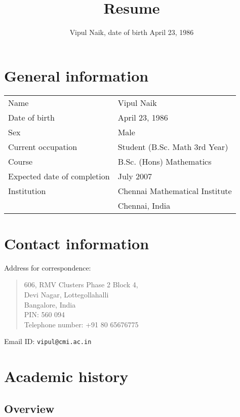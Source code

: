 \documentclass[12pt,a4paper,oneside]{amsart}
\title{Resume}
\author{\small{Vipul Naik, date of birth April 23, 1986}}
\begin{document}
\maketitle
\fancyhead{}
\fancyfoot{}

\cfoot{\thepage}
\section{General information}
\vspace{0.25in}

\begin{tabular}{|l|l|}
  \hline
  Name & Vipul Naik\\
  Date of birth & April 23, 1986\\
  Sex & Male\\
  Current occupation & Student (B.Sc. Math 3rd Year) \\
  Course & B.Sc. (Hons) Mathematics\\
  Expected date of completion & July 2007 \\
  Institution & Chennai Mathematical Institute\\
  & Chennai, India\\
  \hline
\end{tabular}

\section{Contact information}

Address for correspondence:

\begin{quote}
  606, RMV Clusters Phase 2 Block 4,\\
  Devi Nagar, Lottegollahalli\\
  Bangalore, India\\
  PIN: 560 094\\
  Telephone number: +91 80 65676775\\
\end{quote}

Email ID: {\tt vipul@cmi.ac.in}

\section{Academic history}

\subsection{Overview}
\end{document}

